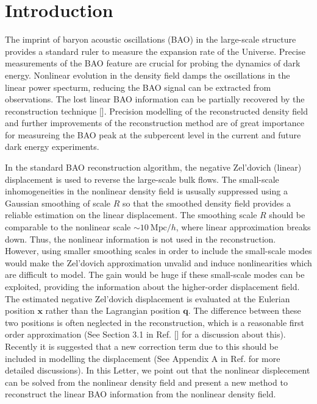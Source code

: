 \documentclass[aps,prd,twocolumn,showpacs,superscriptaddress,groupedaddress,nofootinbib]{revtex4}  %
\newcommand{\mr}{\mathrm}
\begin{document}
\section{Introduction}
The imprint of baryon acoustic oscillations (BAO) in the
large-scale structure provides a standard ruler to measure the expansion rate
of the Universe. Precise measurements of the BAO feature are crucial for 
probing the dynamics of dark energy.
Nonlinear evolution in the density field damps the oscillations in the linear
power specturm, reducing the BAO signal can be extracted from observations. 
The lost linear BAO information can be partially recovered by the reconstruction
technique []. Precision modelling of the reconstructed density field and 
further improvements of the reconstruction method are of great importance
for measureing the BAO peak at the subpercent level in the current and future
dark energy experiments.

In the standard BAO reconstruction algorithm, the negative Zel'dovich (linear)
displacement is used to reverse the large-scale bulk flows.
The small-scale inhomogeneities in the nonlinear density field is ususally
suppressed using a Gaussian smoothing of scale $R$ so that the smoothed density
field provides a reliable estimation on the linear displacement.
The smoothing scale $R$ should be comparable to the nonlinear scale 
$\sim10\ \mr{Mpc}/h$, where linear approximation breaks down.
Thus, the nonlinear information is not used in the reconstruction. 
However, using smaller smoothing scales in order to include the small-scale 
modes would make the Zel'dovich approximation unvalid and induce
nonlinearities which are difficult to model.
The gain would be huge if these small-scale modes can be exploited, providing
the information about the higher-order displacement field.
The estimated negative Zel'dovich displacement is evaluated at the Eulerian 
position $\bm{x}$ rather than the Lagrangian position $\bm{q}$. The difference
between these two positions is often neglected in the reconstruction, which
is a reasonable first order approximation (See Section 3.1 in Ref. [] for a 
discussion about this). Recently it is suggested that a new correction term
due to this should be included in modelling the displacement (See Appendix A
in Ref.  for more detailed discussions).
In this Letter, we point out that the nonlinear displecement can be solved
from the nonlinear density field and present a new method to reconstruct
the linear BAO information from the nonlinear density field.
\end{document}
